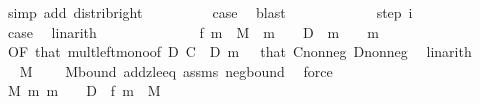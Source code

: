 \begin{isabellebody}
\ {\isacharparenleft}{\kern0pt}simp\ add{\isacharcolon}{\kern0pt}\ distrib{\isacharunderscore}{\kern0pt}right{\isacharparenright}{\kern0pt}\isanewline
\ \ \ \ \ \ \isamarkupfalse%
\ \isamarkupfalse%
\ {\isacharquery}{\kern0pt}case\ \isamarkupfalse%
\ blast\isanewline
\ \ \ \ \isamarkupfalse%
\isanewline
\ \ \ \ \ \ \isamarkupfalse%
\ {\isacharparenleft}{\kern0pt}step{}\ i{\isacharparenright}{\kern0pt}\isanewline
\ \ \ \ \ \ \isamarkupfalse%
\ \isamarkupfalse%
\ {\isacharquery}{\kern0pt}case\ \isamarkupfalse%
\ linarith\isanewline
\ \ \ \ \isamarkupfalse%
\isanewline
\ \ \isanewline
\ \ \ \ \isamarkupfalse%
\ {\isacharasterisk}{\kern0pt}{\isacharcolon}{\kern0pt}\ {\isachardoublequoteopen}f\ {\isacharparenleft}{\kern0pt}m\ {\isacharasterisk}{\kern0pt}\ M{\isacharparenright}{\kern0pt}\ {\isasymge}\ {\isacharparenleft}{\kern0pt}m\ {\isacharplus}{\kern0pt}\ {}{\isacharparenright}{\kern0pt}\ {\isacharasterisk}{\kern0pt}\ D{\isachardoublequoteclose}\ \ {\isachardoublequoteopen}m\ {\isachargreater}{\kern0pt}\ {}{\isachardoublequoteclose}\ \ m\ \isamarkupfalse%
\ {\isacharasterisk}{\kern0pt}{\isacharbrackleft}{\kern0pt}OF\ that{\isacharbrackright}{\kern0pt}\ mult{\isacharunderscore}{\kern0pt}left{\isacharunderscore}{\kern0pt}mono{\isacharbrackleft}{\kern0pt}of\ D\ {\isachardoublequoteopen}C\ {\isacharplus}{\kern0pt}\ D{\isachardoublequoteclose}\ {\isachardoublequoteopen}m\ {\isacharplus}{\kern0pt}\ {}{\isachardoublequoteclose}{\isacharbrackright}{\kern0pt}\ that\ C{\isacharunderscore}{\kern0pt}nonneg\ D{\isacharunderscore}{\kern0pt}nonneg\ \isamarkupfalse%
\ linarith\isanewline
\ \ \ \ \isamarkupfalse%
\ \isamarkupfalse%
\ {\isachardoublequoteopen}M\ {\isasymnoteq}\ {}{\isachardoublequoteclose}\ \isamarkupfalse%
\ M{\isacharunderscore}{\kern0pt}bound\ add{}{\isacharunderscore}{\kern0pt}zle{\isacharunderscore}{\kern0pt}eq\ assms\ neg{\isacharunderscore}{\kern0pt}bound\ \isamarkupfalse%
\ force\isanewline
\ \ \ \ \isamarkupfalse%
\ \isamarkupfalse%
\ {\isachardoublequoteopen}{\isasymexists}M{\isachargreater}{\kern0pt}{}{\isachardot}{\kern0pt}\ {\isasymforall}m{\isachargreater}{\kern0pt}{}{\isachardot}{\kern0pt}\ {\isacharparenleft}{\kern0pt}m\ {\isacharplus}{\kern0pt}\ {}{\isacharparenright}{\kern0pt}\ {\isacharasterisk}{\kern0pt}\ D\ {\isasymle}\ f\ {\isacharparenleft}{\kern0pt}m\ {\isacharasterisk}{\kern0pt}\ M{\isacharparenright}{\kern0pt}\ {\isachardoublequoteclose}\ \isamarkupfalse%

\end{isabellebody}
